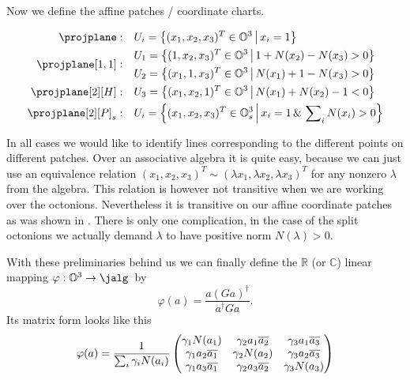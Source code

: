 Now we define the affine patches / coordinate charts.

\begin{align}
\projplane: & \quad U_i = \set{(x_1, x_2, x_3)^T \in \octo^3 \,\middle|\, x_i = 1} \\
\projplane[1,1]:  & \quad 
	\begin{aligned}
			U_1 &= \set{(1, x_2, x_3)^T \in \octo^3 \,\middle|\, 1 + N(x_2) - N(x_3) > 0} \\
			U_2 &= \set{(x_1, 1, x_3)^T \in \octo^3 \,\middle|\, N(x_1) + 1  - N(x_3) > 0} \\
    \end{aligned} \\
\projplane[2][H]:  & \quad U_3 = \set{(x_1, x_2, 1)^T \in \octo^3 \,\middle|\, N(x_1) + N(x_2) - 1 < 0} \\
\projplane[2][P]_s: & \quad U_i = \set{(x_1, x_2, x_3)^T \in \octo_s^3 \,\middle|\, x_i = 1 \,\&\, \sum\nolimits_i N(x_i) > 0}
\end{align}

In all cases we would like to identify lines corresponding to the different points on different patches. Over an associative algebra it is quite easy, because we can just use an equivalence relation $(x_1, x_2, x_3)^T \sim  (\lambda x_1, \lambda x_2,\lambda x_3)^T$ for any nonzero $\lambda$ from the algebra. This relation is however not transitive when we are working over the octonions. Nevertheless it is transitive on our affine coordinate patches as was shown in \cite{held_semi-riemannian_2009}. There is only one complication, in the case of the split octonions we actually demand $\lambda$ to have positive norm $N(\lambda) > 0$.


With these preliminaries behind us we can finally define the $\mathbb{R}$ (or $\mathbb{C}$) linear mapping $\varphi: \octo^3 \to \jalg $\ by
\[
	\varphi(a) = \frac{a(Ga)^\dagger}{a^\dagger Ga}.
\]
Its matrix form looks like this
\begin{equation}\label{eq:varphi}
\varphi(a) = \frac{1}{\sum\nolimits_i\gamma_i N(a_i)} 
	\begin{pmatrix}
		\gamma_1 N(a_1) & \gamma_2 a_1 \overline{a_2} & \gamma_3 a_1 \overline{a_3} \\
		\gamma_1 a_2\overline{a_1} & \gamma_2 N(a_2)  & \gamma_3 a_2 \overline{a_3} \\
		\gamma_1 a_3\overline{a_1} & \gamma_2 a_3 \overline{a_2} & \gamma_3 N(a_3) \\
	\end{pmatrix}
\end{equation}

